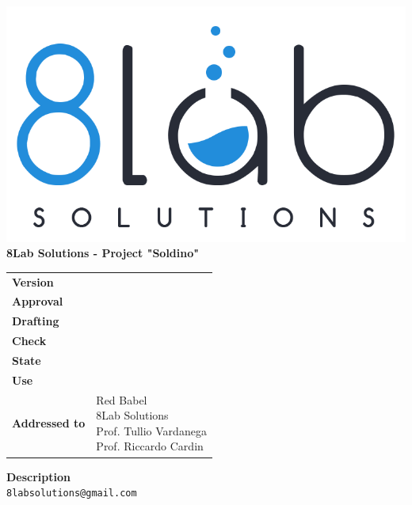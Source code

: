 \thispagestyle{empty}
\begin{titlepage}
	\begin{center}
		\includegraphics[scale = 0.3]{res/images/logo8_crop.png}\\
		\large \textbf{8Lab Solutions - Project "Soldino"} \\
		\vfill
		\Huge \textbf{\doctitle}
		\vspace*{\fill}
        
        \vfill
        \large
    \end{center}
	\begin{table}[htbp]
        \centering
        \hspace*{2cm}
        \begin{tabular}{l|l}
            \textbf{Version} & \rev{} \\
            \textbf{Approval} & \\%
            \textbf{Drafting} & \red{} \\
            \textbf{Check} & \ver{} \\
            \textbf{State} & \stato{} \\
            \textbf{Use} & \uso{} \\
            \textbf{Addressed to} & \parbox[t]{5cm}{Red Babel \\8Lab Solutions
            \\Prof. Tullio Vardanega\\Prof. Riccardo Cardin}
        \end{tabular}
    \end{table}
    \begin{center}
        \vfill
        \normalsize
        \textbf{Description}\\
		\describedoc
        \vfill
        \small
        \texttt{8labsolutions@gmail.com}
	\end{center}
\end{titlepage}
